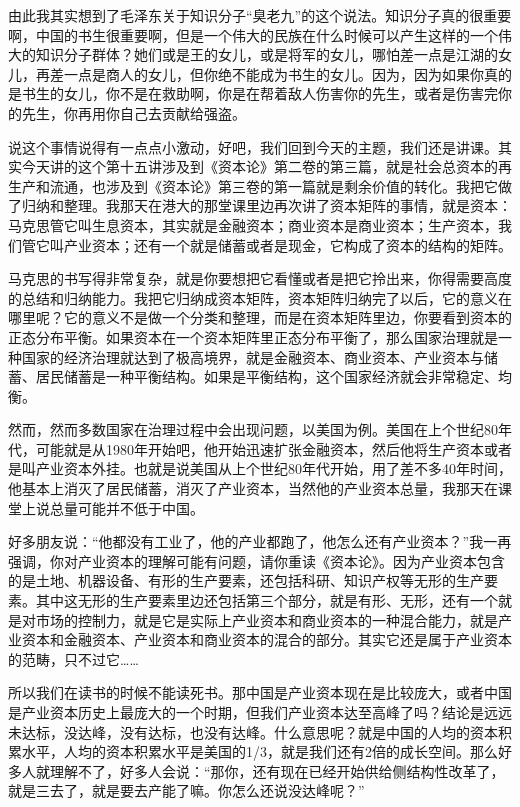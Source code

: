 \documentclass[UTF8, 12pt, a4paper]{ctexrep}
\begin{document}
由此我其实想到了毛泽东关于知识分子“臭老九”的这个说法。知识分子真的很重要啊，中国的书生很重要啊，但是一个伟大的民族在什么时候可以产生这样的一个伟大的知识分子群体？她们或是王的女儿，或是将军的女儿，哪怕差一点是江湖的女儿，再差一点是商人的女儿，但你绝不能成为书生的女儿。因为，因为如果你真的是书生的女儿，你不是在救助啊，你是在帮着敌人伤害你的先生，或者是伤害完你的先生，你再用你自己去贡献给强盗。

说这个事情说得有一点点小激动，好吧，我们回到今天的主题，我们还是讲课。其实今天讲的这个第十五讲涉及到《资本论》第二卷的第三篇，就是社会总资本的再生产和流通，也涉及到《资本论》第三卷的第一篇就是剩余价值的转化。我把它做了归纳和整理。我那天在港大的那堂课里边再次讲了资本矩阵的事情，就是资本：马克思管它叫生息资本，其实就是金融资本；商业资本是商业资本；生产资本，我们管它叫产业资本；还有一个就是储蓄或者是现金，它构成了资本的结构的矩阵。

马克思的书写得非常复杂，就是你要想把它看懂或者是把它拎出来，你得需要高度的总结和归纳能力。我把它归纳成资本矩阵，资本矩阵归纳完了以后，它的意义在哪里呢？它的意义不是做一个分类和整理，而是在资本矩阵里边，你要看到资本的正态分布平衡。如果资本在一个资本矩阵里正态分布平衡了，那么国家治理就是一种国家的经济治理就达到了极高境界，就是金融资本、商业资本、产业资本与储蓄、居民储蓄是一种平衡结构。如果是平衡结构，这个国家经济就会非常稳定、均衡。

然而，然而多数国家在治理过程中会出现问题，以美国为例。美国在上个世纪80年代，可能就是从1980年开始吧，他开始迅速扩张金融资本，然后他将生产资本或者是叫产业资本外挂。也就是说美国从上个世纪80年代开始，用了差不多40年时间，他基本上消灭了居民储蓄，消灭了产业资本，当然他的产业资本总量，我那天在课堂上说总量可能并不低于中国。

好多朋友说：“他都没有工业了，他的产业都跑了，他怎么还有产业资本？”我一再强调，你对产业资本的理解可能有问题，请你重读《资本论》。因为产业资本包含的是土地、机器设备、有形的生产要素，还包括科研、知识产权等无形的生产要素。其中这无形的生产要素里边还包括第三个部分，就是有形、无形，还有一个就是对市场的控制力，就是它是实际上产业资本和商业资本的一种混合能力，就是产业资本和金融资本、产业资本和商业资本的混合的部分。其实它还是属于产业资本的范畴，只不过它……

所以我们在读书的时候不能读死书。那中国是产业资本现在是比较庞大，或者中国是产业资本历史上最庞大的一个时期，但我们产业资本达至高峰了吗？结论是远远未达标，没达峰，没有达标，也没有达峰。什么意思呢？就是中国的人均的资本积累水平，人均的资本积累水平是美国的1/3，就是我们还有2倍的成长空间。那么好多人就理解不了，好多人会说：“那你，还有现在已经开始供给侧结构性改革了，就是三去了，就是要去产能了嘛。你怎么还说没达峰呢？”
\end{document}
